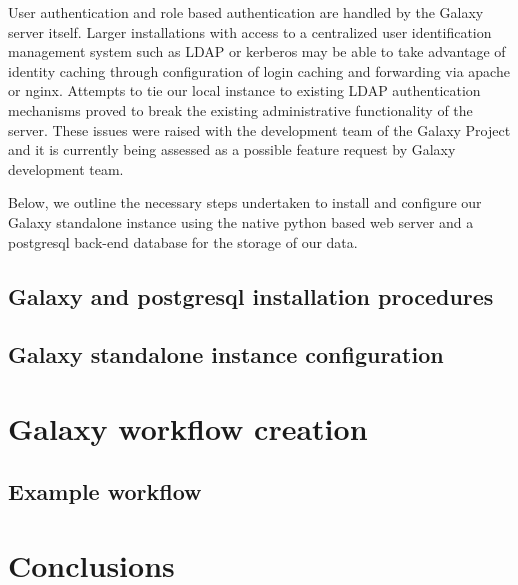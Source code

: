 \documentclass[a4paper,10pt]{article}
\begin{document}
User authentication and role based authentication are handled by the Galaxy server itself.  Larger installations with access to a centralized user identification management system such as LDAP or kerberos may be able to take advantage of identity caching through configuration of login caching and forwarding via apache or nginx.  Attempts to tie our local instance to existing LDAP authentication mechanisms proved to break the existing administrative functionality of the server.  These issues were raised with the development team of the Galaxy Project and it is currently being assessed as a possible feature request by Galaxy development team.

Below, we outline the necessary steps undertaken to install and configure our Galaxy standalone instance using the native python based web server and a postgresql back-end database for the storage of our data.
\subsection{Galaxy and postgresql installation procedures}
\subsection{Galaxy standalone instance configuration}
\section{Galaxy workflow creation}
\subsection{Example workflow}
\section{Conclusions}
\end{document}
